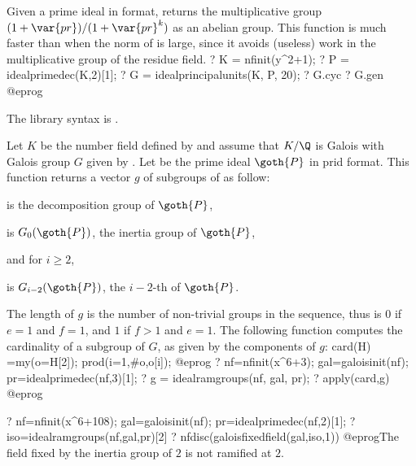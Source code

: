 \label{se:idealprincipalunits}
Given a prime ideal in  format,
returns the multiplicative group $(1 + \var{pr}) / (1 + \var{pr}^k)$ as an
abelian group. This function is much faster than  when the
norm of  is large, since it avoids (useless) work in the
multiplicative group of the residue field.
\bprog
? K = nfinit(y^2+1);
? P = idealprimedec(K,2)[1];
? G = idealprincipalunits(K, P, 20);
? G.cyc
? G.gen
@eprog

The library syntax is .

\label{se:idealramgroups}
Let $K$ be the number field defined by  and assume that $K/\Q$ is
Galois with Galois group $G$ given by .
Let  be the prime ideal $\goth{P}$ in prid format.
This function returns a vector $g$ of subgroups of 
as follow:

\item {} is the decomposition group of $\goth{P}$,

\item {} is $G_0(\goth{P})$, the inertia group of $\goth{P}$,

and for $i\geq 2$,

\item {} is $G_{i-2}(\goth{P})$, the $i-2$-th
 of $\goth{P}$.

\noindent The length of $g$ is the number of non-trivial groups in the
sequence, thus is $0$ if $e=1$ and $f=1$, and $1$ if $f>1$ and $e=1$.
The following function computes the cardinality of a subgroup of $G$,
as given by the components of $g$:
\bprog
card(H) =my(o=H[2]); prod(i=1,#o,o[i]);
@eprog
\bprog
? nf=nfinit(x^6+3); gal=galoisinit(nf); pr=idealprimedec(nf,3)[1];
? g = idealramgroups(nf, gal, pr);
? apply(card,g)
@eprog

\bprog
? nf=nfinit(x^6+108); gal=galoisinit(nf); pr=idealprimedec(nf,2)[1];
? iso=idealramgroups(nf,gal,pr)[2]
? nfdisc(galoisfixedfield(gal,iso,1))
@eprog\noindent The field fixed by the inertia group of $2$ is not ramified at
$2$.

